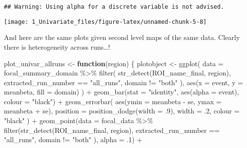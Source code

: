 \documentclass[
]{article}
\newenvironment{Shaded}{\begin{snugshade}}{\end{snugshade}}
\newcommand{\AttributeTok}[1]{\textcolor[rgb]{0.77,0.63,0.00}{#1}}
\newcommand{\ControlFlowTok}[1]{\textcolor[rgb]{0.13,0.29,0.53}{\textbf{#1}}}
\newcommand{\DecValTok}[1]{\textcolor[rgb]{0.00,0.00,0.81}{#1}}
\newcommand{\FunctionTok}[1]{\textcolor[rgb]{0.00,0.00,0.00}{#1}}
\newcommand{\NormalTok}[1]{#1}
\newcommand{\OtherTok}[1]{\textcolor[rgb]{0.56,0.35,0.01}{#1}}
\newcommand{\SpecialCharTok}[1]{\textcolor[rgb]{0.00,0.00,0.00}{#1}}
\newcommand{\StringTok}[1]{\textcolor[rgb]{0.31,0.60,0.02}{#1}}
\begin{document}
\begin{verbatim}
## Warning: Using alpha for a discrete variable is not advised.
\end{verbatim}

\texttt{[image: 1\_Univariate\_files/figure-latex/unnamed-chunk-5-8]}

And here are the same plots given second level maps of the same data.
Clearly there is heterogeneity across runs\ldots!

\begin{Shaded}
\begin{Highlighting}[]
\NormalTok{plot\_univar\_allruns }\OtherTok{\textless{}{-}} \ControlFlowTok{function}\NormalTok{(region) \{}
\NormalTok{  plotobject }\OtherTok{\textless{}{-}}
    \FunctionTok{ggplot}\NormalTok{(}
      \AttributeTok{data =}\NormalTok{ focal\_summary\_domain }\SpecialCharTok{\%\textgreater{}\%} \FunctionTok{filter}\NormalTok{(}
        \FunctionTok{str\_detect}\NormalTok{(ROI\_name\_final, region),}
\NormalTok{        extracted\_run\_number }\SpecialCharTok{==} \StringTok{"all\_runs"}\NormalTok{,}
\NormalTok{        domain }\SpecialCharTok{!=} \StringTok{"both"}
\NormalTok{      ),}
      \FunctionTok{aes}\NormalTok{(}\AttributeTok{x =}\NormalTok{ event, }\AttributeTok{y =}\NormalTok{ meanbeta, }\AttributeTok{fill =}\NormalTok{ domain)}
\NormalTok{    ) }\SpecialCharTok{+}
    \FunctionTok{geom\_bar}\NormalTok{(}\AttributeTok{stat =} \StringTok{"identity"}\NormalTok{, }\FunctionTok{aes}\NormalTok{(}\AttributeTok{alpha =}\NormalTok{ event), }\AttributeTok{colour =} \StringTok{"black"}\NormalTok{) }\SpecialCharTok{+}
    \FunctionTok{geom\_errorbar}\NormalTok{(}
      \FunctionTok{aes}\NormalTok{(}\AttributeTok{ymin =}\NormalTok{ meanbeta }\SpecialCharTok{{-}}\NormalTok{ se, }\AttributeTok{ymax =}\NormalTok{ meanbeta }\SpecialCharTok{+}\NormalTok{ se),}
      \AttributeTok{position =} \FunctionTok{position\_dodge}\NormalTok{(}\AttributeTok{width =}\NormalTok{ .}\DecValTok{9}\NormalTok{),}
      \AttributeTok{width =}\NormalTok{ .}\DecValTok{2}\NormalTok{,}
      \AttributeTok{colour =} \StringTok{"black"}
\NormalTok{    ) }\SpecialCharTok{+}
    \FunctionTok{geom\_point}\NormalTok{(}\AttributeTok{data =}\NormalTok{ focal\_data }\SpecialCharTok{\%\textgreater{}\%} \FunctionTok{filter}\NormalTok{(}\FunctionTok{str\_detect}\NormalTok{(ROI\_name\_final, region), extracted\_run\_number }\SpecialCharTok{==} \StringTok{"all\_runs"}\NormalTok{, domain }\SpecialCharTok{!=} \StringTok{"both"}
\NormalTok{),}
               \AttributeTok{alpha =}\NormalTok{ .}\DecValTok{1}\NormalTok{) }\SpecialCharTok{+}

\end{Highlighting}
\end{Shaded}
\end{document}
